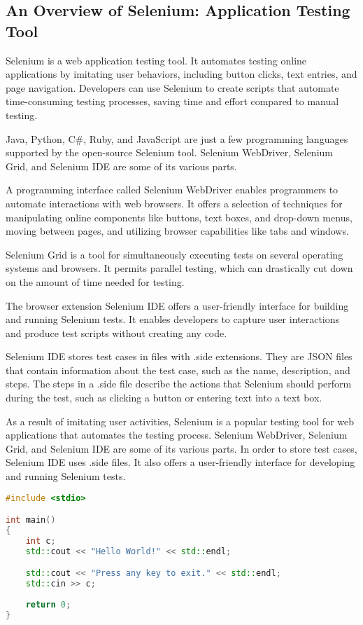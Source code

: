 \subsection{An Overview of Selenium: Application Testing Tool}

Selenium is a web application testing tool. It automates testing online applications by imitating user behaviors, including button clicks, text entries, and page navigation. Developers can use Selenium to create scripts that automate time-consuming testing processes, saving time and effort compared to manual testing.

Java, Python, C#, Ruby, and JavaScript are just a few programming languages supported by the open-source Selenium tool. Selenium WebDriver, Selenium Grid, and Selenium IDE are some of its various parts.

A programming interface called Selenium WebDriver enables programmers to automate interactions with web browsers. It offers a selection of techniques for manipulating online components like buttons, text boxes, and drop-down menus, moving between pages, and utilizing browser capabilities like tabs and windows.

Selenium Grid is a tool for simultaneously executing tests on several operating systems and browsers. It permits parallel testing, which can drastically cut down on the amount of time needed for testing.

The browser extension Selenium IDE offers a user-friendly interface for building and running Selenium tests. It enables developers to capture user interactions and produce test scripts without creating any code.

Selenium IDE stores test cases in files with .side extensions. They are JSON files that contain information about the test case, such as the name, description, and steps. The steps in a .side file describe the actions that Selenium should perform during the test, such as clicking a button or entering text into a text box.

As a result of imitating user activities, Selenium is a popular testing tool for web applications that automates the testing process. Selenium WebDriver, Selenium Grid, and Selenium IDE are some of its various parts. In order to store test cases, Selenium IDE uses .side files. It also offers a user-friendly interface for developing and running Selenium tests.



\begin{lstlisting}[language={C++}]
#include <stdio>

int main() 
{
	int c;
	std::cout << "Hello World!" << std::endl;

	std::cout << "Press any key to exit." << std::endl;
	std::cin >> c;
	
	return 0;
}
\end{lstlisting}

